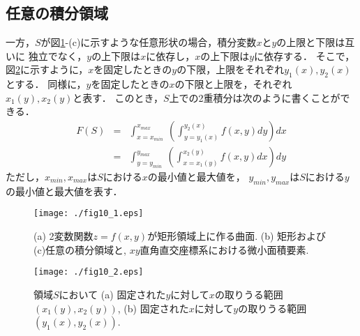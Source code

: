 ﻿\documentclass[10pt,a4j]{jbook}
\begin{document}
\subsection{任意の積分領域}
一方，$S$が図\ref{fig:fig10_1}-(c)に示すような任意形状の場合，積分変数$x$と$y$の上限と下限は互いに
独立でなく，$y$の上下限は$x$に依存し，$x$の上下限は$y$に依存する．
そこで，図\ref{fig:fig10_2}に示すように，$x$を固定したときの$y$の下限，上限をそれぞれ$y_1(x),y_2(x)$とする．
同様に，$y$を固定したときの$x$の下限と上限を，それぞれ$x_1(y),x_2(y)$と表す．
このとき，$S$上での2重積分は次のように書くことができる．
\begin{eqnarray}
	F(S) &=& 
	\int_{x=x_{min}}^{x_{max}}\ \left( \int_{y=y_1(x)}^{y_2(x)}f(x,y)dy\right) dx
	\label{eqn:iint_xy}
	\\
	&=& 
	\int_{y=y_{min}}^{y_{max}}\ \left( \int_{x=x_1(y)}^{x_2(y)}f(x,y)dx\right) dy
	\label{eqn:iint_yx}
\end{eqnarray}
ただし，$x_{min},x_{max}$は$S$における$x$の最小値と最大値を，
$y_{min},y_{max}$は$S$における$y$の最小値と最大値を表す．
\begin{figure}[h]
	\begin{center}
	\texttt{[image: ./fig10\_1.eps]} 
	\end{center}
	\caption{
		(a) 2変数関数$z=f(x,y)$が矩形領域上に作る曲面. 
		(b) 矩形および(c)任意の積分領域と, $xy$直角直交座標系における微小面積要素. 
	} 
	\label{fig:fig10_1}
\end{figure}
\begin{figure}[h]
	\begin{center}
	\texttt{[image: ./fig10\_2.eps]} 
	\end{center}
	\caption{
		領域$S$において
		(a) 固定された$y$に対して$x$の取りうる範囲$\left(x_1(y),x_2(y)\right)$, 
		(b) 固定された$x$に対して$y$の取りうる範囲$\left(y_1(x),y_2(x)\right)$. 
	} 
	\label{fig:fig10_2}
\end{figure}
\end{document}
